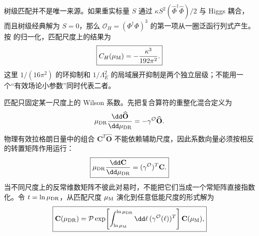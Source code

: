 树级匹配并不是唯一来源。如果重实标量 $S$ 通过 $\kappa S^2(\widehat\Phi^\dagger\widehat\Phi)/2$ 与 Higgs 耦合，而且树级经典解为 $S=0$，那么 $\mathcal O_H=(\Phi^\dagger\Phi)^3$ 的第一项从一圈泛函行列式产生。按 的归一化，匹配尺度上的结果为
\begin{equation}
\boxed{
C_H(\mu_{\rm M})=-\frac{\kappa^3}{192\pi^2}.}
\label{eq:heavy-scalar-ch-loop-dp32}
\end{equation}
这里 $1/(16\pi^2)$ 的环抑制和 $1/\Lambda_E^2$ 的局域展开抑制是两个独立层级；不能用一个“有效场论小参数”同时代表二者。

匹配只固定某一尺度上的 Wilson 系数。先把复合算符的重整化混合定义为
\begin{equation}
 \mu_{\rm DR}\frac{\dd\widehat{\mathbf O}}{\dd\mu_{\rm DR}}
 =-\gamma^{\mathcal O}\widehat{\mathbf O}.
 \label{eq:smeft-operator-rg-dp68}
\end{equation}
物理有效拉格朗日量中的组合 $\mathbf C^T\widehat{\mathbf O}$ 不能依赖辅助尺度，因此系数向量必须按相反的转置矩阵作用运行：
\begin{equation}
\boxed{
\mu_{\rm DR}\frac{\dd\mathbf C}{\dd\mu_{\rm DR}}
=(\gamma^{\mathcal O})^T\mathbf C.}
\label{eq:smeft-wilson-rg-dp32}
\end{equation}
当不同尺度上的反常维数矩阵不彼此对易时，不能把它们当成一个常矩阵直接指数化。令 $t=\ln\mu_{\rm DR}$，从匹配尺度 $\mu_{\rm M}$ 演化到任意低能尺度的形式解为
\begin{equation}
\boxed{
\mathbf C(\mu_{\rm DR})
=\mathcal P\exp\!\left[
\int_{\ln\mu_{\rm M}}^{\ln\mu_{\rm DR}}\dd\ell\,
(\gamma^{\mathcal O}(\ell))^T
\right]\mathbf C(\mu_{\rm M}),}
\label{eq:smeft-wilson-evolution-dp90}
\end{equation}

